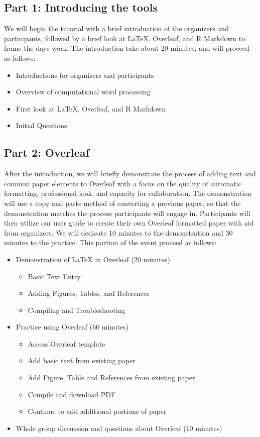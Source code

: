 \documentclass{article}
\begin{document}
\subsection{Part 1: Introducing the tools} 
We will begin the tutorial with a brief introduction of the organizers and participants, followed by a brief look at LaTeX, Overleaf, and R Markdown to frame the days work. The introduction take about 20 minutes, and will proceed as follows:
\begin{itemize}
  \item Introductions for organizers and participants
  \item Overview of computational word processing
  \item First look at LaTeX, Overleaf, and R Markdown
  \item Initial Questions
\end{itemize}

\subsection{Part 2: Overleaf}
After the introduction, we will briefly demonstrate the process of adding text and common paper elements to Overleaf with a focus on the quality of automatic formatting, professional look, and capacity for collaboration. The demonstration will use a copy and paste method of converting a previous paper, so that the demonstration matches the process participants will engage in. Participants will then utilize our user guide to create their own Overleaf formatted paper with aid from organizers. We will dedicate 10 minutes to the demonstration and 30 minutes to the practice. This portion of the event proceed as follows: 
\begin{itemize}
    \item Demonstration of LaTeX in Overleaf (20 minutes)
    \begin{itemize}
        \item Basic Text Entry
        \item Adding Figures, Tables, and References
        \item Compiling and Troubleshooting
    \end{itemize}
    \item Practice using Overleaf (60 minutes)
    \begin{itemize}
        \item Access Overleaf template
        \item Add basic text from existing paper
        \item Add Figure, Table and References from existing paper
        \item Compile and download PDF
        \item Continue to add additional portions of paper
    \end{itemize}
    \item Whole group discussion and questions about Overleaf (10 minutes)
\end{itemize}
\end{document}
